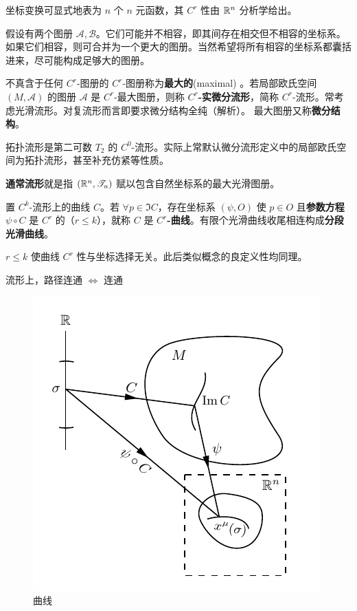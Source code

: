 \begin{remark}
    坐标变换可显式地表为 $n$ 个 $n$ 元函数，其 $C^r$ 性由 $\mathbb{R}^n$ 分析学给出。
\end{remark}

假设有两个图册 $\mathcal A,\mathcal B$。它们可能并不相容，即其间存在相交但不相容的坐标系。如果它们相容，则可合并为一个更大的图册。当然希望将所有相容的坐标系都囊括进来，尽可能构成足够大的图册。

\begin{definition}
    不真含于任何 $C^r$-图册的 $C^r$-图册称为\textbf{最大的}(maximal) 。若局部欧氏空间 $(M,\mathcal A)$ 的图册 $\mathcal A$ 是 $C^r$-最大图册，则称 \textbf{$C^r$-实微分流形}，简称 $C^r$-流形。常考虑光滑流形。对复流形而言即要求微分结构全纯（解析）。
    最大图册又称\textbf{微分结构}。
\end{definition}

\begin{remark}
    拓扑流形是第二可数 $T_2$ 的 $C^0$-流形。实际上常默认微分流形定义中的局部欧氏空间为拓扑流形，甚至补充仿紧等性质。
\end{remark}

\begin{eg}
    \textbf{通常流形}就是指 $(\mathbb{R}^n,\mathscr T_u)$ 赋以包含自然坐标系的最大光滑图册。
\end{eg}

\begin{definition}
    置 $C^k$-流形上的曲线 $C$。若 $\forall p\in \Im C$，存在坐标系 $(\psi,O)$ 使 $p\in O$ 且\textbf{参数方程} $\psi\circ C$ 是 $C^r$ 的（$r\leqslant k$），就称 $C$ 是 $C^r$\textbf{-曲线}。有限个光滑曲线收尾相连构成\textbf{分段光滑曲线}。
\end{definition}

\begin{remark}
    $r\leqslant k$ 使曲线 $C^r$ 性与坐标选择无关。此后类似概念的良定义性均同理。
\end{remark}

\begin{theorem}
    流形上，路径连通 $\iff$ 连通
\end{theorem}

\begin{figure}[ht]
    \centering
    \includegraphics[width=.4\textwidth]{fig/appx/curve.pdf}
    \caption{曲线}
\end{figure}

